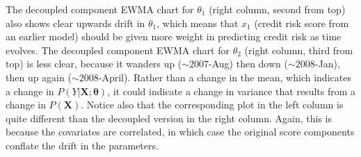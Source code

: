 \documentclass[twoside,11pt]{article}
\begin{document}
The decoupled component EWMA chart for $\theta_1$ (right column, second from top) also shows clear upwards drift in $\theta_1$, which means that $x_1$ (credit risk score from an earlier model) should be given more weight in predicting credit risk as time evolves. The decoupled component EWMA chart for $\theta_2$ (right column, third from top) is less clear, because it wanders up ($\sim 2007$-Aug) then down ($\sim 2008$-Jan), then up again ($\sim 2008$-April). Rather than a change in the mean, which indicates a change in $P(Y|\bm{X};\bm{\theta})$, it could indicate a change in variance that results from a change in $P(\bm{X})$. Notice also that the corresponding plot in the left column is quite different than the decoupled version in the right column. Again, this is because the covariates are correlated, in which case the original score components conflate the drift in the parameters.  
\end{document}

